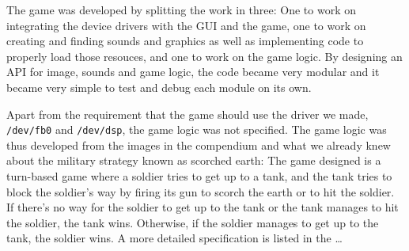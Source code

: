 The game was developed by splitting the work in three: One to work on
integrating the device drivers with the GUI and the game, one to work on
creating and finding sounds and graphics as well as implementing code to
properly load those resouces, and one to work on the game logic. By
designing an API for image, sounds and game logic, the code became
very modular and it became very simple to test and debug each module on
its own.

Apart from the requirement that the game should use the driver we made,
\texttt{/dev/fb0} and \texttt{/dev/dsp}, the game logic was not
specified. The game logic was thus developed from the images in the
compendium\cite{comp} and what we already knew about the military
strategy known as scorched earth: The game designed is a turn-based game
where a soldier tries to get up to a tank, and the tank tries to block
the soldier's way by firing its gun to scorch the earth or to hit the
soldier. If there's no way for the soldier to get up to the tank or the
tank manages to hit the soldier, the tank wins. Otherwise, if the
soldier manages to get up to the tank, the soldier wins. A more detailed
specification is listed in the \ldots


